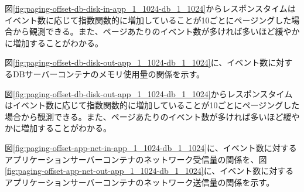 \documentclass[../../../../main]{subfiles}
\begin{document}
    

    図\ref{fig:paging-offset-db-disk-in-app_1_1024-db_1_1024}からレスポンスタイムはイベント数に応じて指数関数的に増加していることが10ごとにページングした場合から観測できる。また、ページあたりのイベント数が多ければ多いほど緩やかに増加することがわかる。

    図\ref{fig:paging-offset-db-disk-out-app_1_1024-db_1_1024}に、イベント数に対するDBサーバーコンテナのメモリ使用量の関係を示す。

    

    図\ref{fig:paging-offset-db-disk-out-app_1_1024-db_1_1024}からレスポンスタイムはイベント数に応じて指数関数的に増加していることが10ごとにページングした場合から観測できる。また、ページあたりのイベント数が多ければ多いほど緩やかに増加することがわかる。

    \label{subsubsubsec:result-paging-offset-only-limit-net-io}

    図\ref{fig:paging-offset-app-net-in-app_1_1024-db_1_1024}に、イベント数に対するアプリケーションサーバーコンテナのネットワーク受信量の関係を、図\ref{fig:paging-offset-app-net-out-app_1_1024-db_1_1024}に、イベント数に対するアプリケーションサーバーコンテナのネットワーク送信量の関係を示す。

    
    
\end{document}
